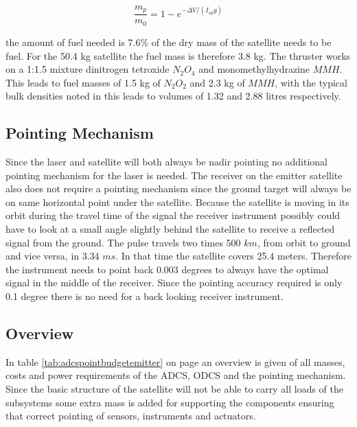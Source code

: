 \begin{equation}
\frac{m_p}{m_0} = 1 - e^{-\Delta V/(I_{sp}g)}
\label{fuelratio}
\end{equation}

the amount of fuel needed is 7.6\% of the dry mass of the satellite needs to be fuel. For the 50.4 kg satellite the fuel mass is therefore 3.8 kg. The thruster works on a 1:1.5 mixture dinitrogen tetroxide $N_2O_4$ and monomethylhydrazine $MMH$. This leads to fuel masses of 1.5 kg of $N_2O_2$ and 2.3 kg of $MMH$, with the typical bulk densities noted in \cite{larson} this leads to volumes of 1.32 and 2.88 litres respectively.

\subsection{Pointing Mechanism}
\label{ss:emDDpoint}
Since the \acs{laser} and satellite will both always be nadir pointing no additional pointing mechanism for the \acs{laser} is needed. The receiver on the emitter satellite also does not require a pointing mechanism since the ground target will always be on same horizontal point under the satellite. Because the satellite is moving in its orbit during the travel time of the signal the receiver instrument possibly could have to look at a small angle slightly behind the satellite to receive a reflected signal from the ground. The pulse travels two times 500 $km$, from orbit to ground and vice versa, in 3.34 $ms$. In that time the satellite covers 25.4 meters. Therefore the instrument needs to point back 0.003 degrees to always have the optimal signal in the middle of the receiver. Since the pointing accuracy required is only 0.1 degree there is no need for a back looking receiver instrument.

\subsection{Overview}
\label{ss:emDDoverview}
In table \ref{tab:adcspointbudgetemitter} on page \pageref{tab:adcspointbudgetemitter} an overview is given of all masses, costs and power requirements of the \ac{ADCS}, \ac{ODCS} and the pointing mechanism. Since the basic structure of the satellite will not be able to carry all loads of the subsystems some extra mass is added for supporting the components ensuring that correct pointing of sensors, instruments and actuators.

